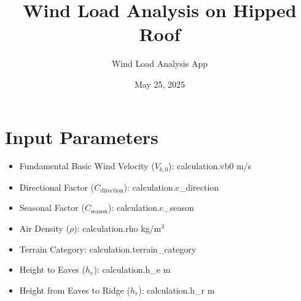 \documentclass[a4paper,12pt]{article}
\begin{document}
\title{Wind Load Analysis on Hipped Roof}
\author{Wind Load Analysis App}
\date{May 25, 2025}
\maketitle

\section{Input Parameters}
\begin{itemize}
    \item Fundamental Basic Wind Velocity ($V_{b,0}$): {{ calculation.vb0 }} m/s
    \item Directional Factor ($C_{\text{direction}}$): {{ calculation.c_direction }}
    \item Seasonal Factor ($C_{\text{season}}$): {{ calculation.c_season }}
    \item Air Density ($\rho$): {{ calculation.rho }} kg/m$^3$
    \item Terrain Category: {{ calculation.terrain_category }}
    \item Height to Eaves ($h_e$): {{ calculation.h_e }} m
    \item Height from Eaves to Ridge ($h_r$): {{ calculation.h_r }} m
\end{itemize}

\end{document}
